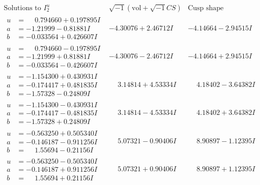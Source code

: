 \documentclass[1p]{elsarticle_modified}
\theoremstyle{definition}
\newcommand{\I}{\sqrt{-1}}
\begin{document}
$$\begin{array}{c|c|c}  
\text{Solutions to }I^u_{2}& \I (\text{vol} + \sqrt{-1}CS) & \text{Cusp shape}\\
 \hline 
\begin{aligned}
u &= \phantom{-}0.794660 + 0.197895 I \\
a &= -1.21999 - 0.81881 I \\
b &= -0.033564 + 0.426607 I\end{aligned}
 & -4.30076 + 2.46712 I & -4.14664 - 2.94515 I \\ \hline\begin{aligned}
u &= \phantom{-}0.794660 - 0.197895 I \\
a &= -1.21999 + 0.81881 I \\
b &= -0.033564 - 0.426607 I\end{aligned}
 & -4.30076 - 2.46712 I & -4.14664 + 2.94515 I \\ \hline\begin{aligned}
u &= -1.154300 + 0.430931 I \\
a &= -0.174417 + 0.481835 I \\
b &= -1.57328 - 0.24809 I\end{aligned}
 & \phantom{-}3.14814 + 4.53334 I & \phantom{-}4.18402 - 3.64382 I \\ \hline\begin{aligned}
u &= -1.154300 - 0.430931 I \\
a &= -0.174417 - 0.481835 I \\
b &= -1.57328 + 0.24809 I\end{aligned}
 & \phantom{-}3.14814 - 4.53334 I & \phantom{-}4.18402 + 3.64382 I \\ \hline\begin{aligned}
u &= -0.563250 + 0.505340 I \\
a &= -0.146187 - 0.911256 I \\
b &= \phantom{-}1.55694 - 0.21156 I\end{aligned}
 & \phantom{-}5.07321 - 0.90406 I & \phantom{-}8.90897 - 1.12395 I \\ \hline\begin{aligned}
u &= -0.563250 - 0.505340 I \\
a &= -0.146187 + 0.911256 I \\
b &= \phantom{-}1.55694 + 0.21156 I\end{aligned}
 & \phantom{-}5.07321 + 0.90406 I & \phantom{-}8.90897 + 1.12395 I \\ \hline\begin{aligned}

\end{aligned}
\end{array}$$
\end{document}
